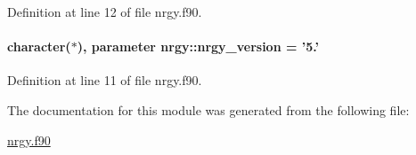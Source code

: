 Definition at line 12 of file nrgy.\-f90.

\hypertarget{classnrgy_a77e39c028132a1d35beb6d56c30d5824}{
\paragraph[{nrgy\-\_\-version}]{\setlength{\rightskip}{0pt plus 5cm}character($\ast$), parameter nrgy\-::nrgy\-\_\-version = '5.'}}\label{classnrgy_a77e39c028132a1d35beb6d56c30d5824}


Definition at line 11 of file nrgy.\-f90.



The documentation for this module was generated from the following file\-:\begin{DoxyCompactItemize}
\item 
\hyperlink{nrgy_8f90}{nrgy.\-f90}\end{DoxyCompactItemize}
